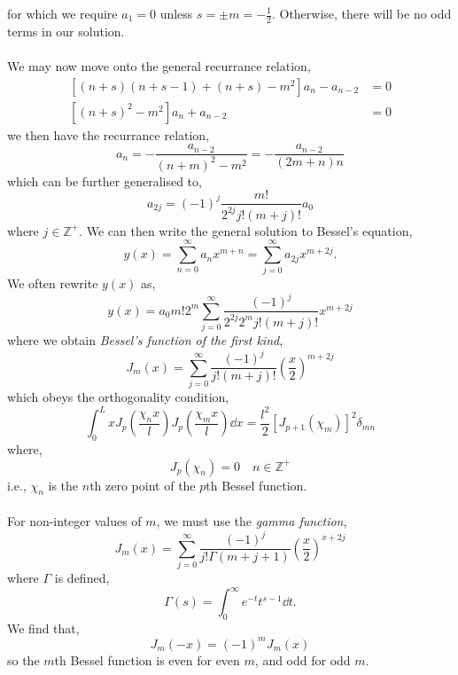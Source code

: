 \documentclass{book}
\begin{document}
for which we require $a_1 = 0$ unless $s = \pm m = -\frac{1}{2}$. Otherwise, there will be no odd terms in our solution.
\\\\
We may now move onto the general recurrance relation,
\begin{equation}
	\begin{split}
		\left[(n+s)(n+s - 1) + (n+s) - m^2\right]a_n - a_{n-2} & = 0 \\
		\left[(n+s)^2 - m^2\right]a_n + a_{n-2} & = 0
	\end{split}
\end{equation}
we then have the recurrance relation,
\begin{equation}
	a_n = -\frac{a_{n-2}}{(n+m)^2 - m^2} = -\frac{a_{n-2}}{(2m+n)n}
\end{equation}
which can be further generalised to,
\begin{equation}
	a_{2j} = (-1)^{j}\frac{m!}{2^{2j}j!(m+j)!}a_0
\end{equation}
where $j \in \mathbb{Z}^{+}$. We can then write the general solution to Bessel's equation,
\begin{equation}
	y(x) = \sum_{n=0}^{\infty}a_nx^{m+n} = \sum_{j=0}^{\infty}a_{2j}x^{m+2j}.
\end{equation}
We often rewrite $y(x)$ as,
\begin{equation}
	y(x) = a_0m!2^m \sum_{j=0}^{\infty} \frac{(-1)^j}{2^{2j}2^mj!(m+j)!}x^{m + 2j}
\end{equation}
where we obtain \textit{Bessel's function of the first kind},
\begin{equation}
	\boxed{J_m(x) = \sum_{j=0}^{\infty}} \frac{(-1)^j}{j!(m+j)!}\left(\frac{x}{2}\right)^{m + 2j}
\end{equation}
which obeys the orthogonality condition,
\begin{equation}
	\int_0^L xJ_p\left(\frac{\chi_n x}{l}\right)J_p\left(\frac{\chi_m x}{l}\right)\dd{x} = \frac{l^2}{2}\left[J_{p+1}\left(\chi_m\right)\right]^2\delta_{mn}
\end{equation}
where,
\begin{equation}
	J_p\left(\chi_n\right) = 0 \hspace{1em} n \in \mathbb{Z}^+
\end{equation}
i.e., $\chi_n$ is the $n$th zero point of the $p$th Bessel function.
\\\\
For non-integer values of $m$, we must use the \textit{gamma function},
\begin{equation}
	J_m(x) = \sum_{j=0}^{\infty}\frac{(-1)^j}{j!\Gamma(m + j + 1)}\left(\frac{x}{2}\right)^{x + 2j}
\end{equation}
where $\Gamma$ is defined,
\begin{equation}
	\Gamma(s) = \int_0^{\infty}e^{-t}t^{s-1}\dd{t}.
\end{equation}
We find that,
\begin{equation}
	J_m(-x) = (-1)^mJ_m(x)
\end{equation}
so the $m$th Bessel function is even for even $m$, and odd for odd $m$.
\end{document}
